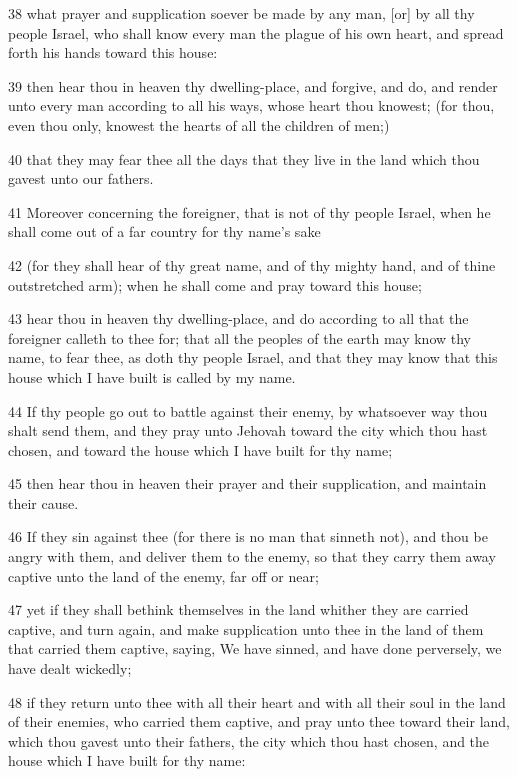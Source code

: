 \par 38 what prayer and supplication soever be made by any man, [or] by all thy people Israel, who shall know every man the plague of his own heart, and spread forth his hands toward this house:
\par 39 then hear thou in heaven thy dwelling-place, and forgive, and do, and render unto every man according to all his ways, whose heart thou knowest; (for thou, even thou only, knowest the hearts of all the children of men;)
\par 40 that they may fear thee all the days that they live in the land which thou gavest unto our fathers.
\par 41 Moreover concerning the foreigner, that is not of thy people Israel, when he shall come out of a far country for thy name's sake
\par 42 (for they shall hear of thy great name, and of thy mighty hand, and of thine outstretched arm); when he shall come and pray toward this house;
\par 43 hear thou in heaven thy dwelling-place, and do according to all that the foreigner calleth to thee for; that all the peoples of the earth may know thy name, to fear thee, as doth thy people Israel, and that they may know that this house which I have built is called by my name.
\par 44 If thy people go out to battle against their enemy, by whatsoever way thou shalt send them, and they pray unto Jehovah toward the city which thou hast chosen, and toward the house which I have built for thy name;
\par 45 then hear thou in heaven their prayer and their supplication, and maintain their cause.
\par 46 If they sin against thee (for there is no man that sinneth not), and thou be angry with them, and deliver them to the enemy, so that they carry them away captive unto the land of the enemy, far off or near;
\par 47 yet if they shall bethink themselves in the land whither they are carried captive, and turn again, and make supplication unto thee in the land of them that carried them captive, saying, We have sinned, and have done perversely, we have dealt wickedly;
\par 48 if they return unto thee with all their heart and with all their soul in the land of their enemies, who carried them captive, and pray unto thee toward their land, which thou gavest unto their fathers, the city which thou hast chosen, and the house which I have built for thy name:
